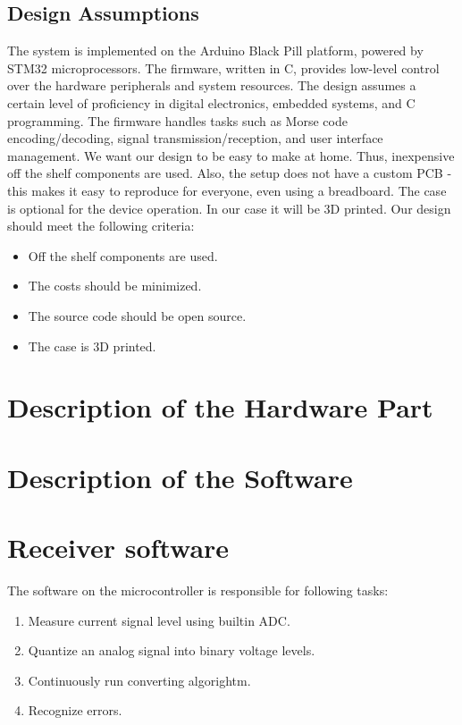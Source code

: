 \documentclass[12pt]{article}
\begin{document}
	\subsection{Design Assumptions}
  The system is implemented on the Arduino Black Pill platform, powered by STM32 microprocessors. The firmware, written in C, provides low-level control over the hardware peripherals and system resources. The design assumes a certain level of 
  proficiency in digital electronics, embedded systems, and C programming. The firmware handles tasks such as Morse code encoding/decoding, signal transmission/reception, and user interface management.
  We want our design to be easy to make at home. Thus, inexpensive off the shelf components are used.
  Also, the setup does not have a custom PCB - this makes it easy to reproduce for everyone, even using a breadboard.	
  The case is optional for the device operation. In our case it will be 3D printed.
  Our design should meet the following criteria:
  \begin{itemize}
    \item Off the shelf components are used.
    \item The costs should be minimized.
    \item The source code should be open source.
    \item The case is 3D printed.
  \end{itemize}
	\section{Description of the Hardware Part}
	
	\section{Description of the Software}
	\section{Receiver software}
  The software on the microcontroller is responsible for following tasks:
  \begin{enumerate}
    \item Measure current signal level using builtin ADC.
    \item Quantize an analog signal into binary voltage levels.
    \item Continuously run converting algorightm.
    \item Recognize errors.
  \end{enumerate}
\end{document}
